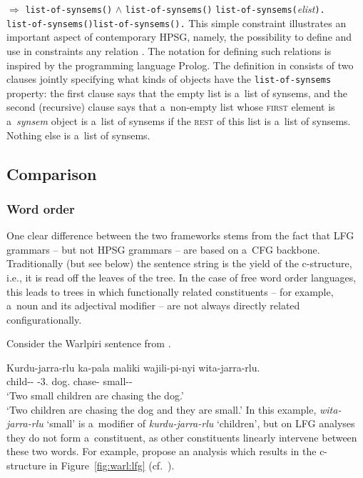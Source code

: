 \documentclass[output=paper,hidelinks]{langscibook}
\begin{document}
\ea\label{valss}
 \ensuremath{\Rightarrow} \texttt{list-of-synsems(\avm{\1})} $\land$ \texttt{list-of-synsems(\avm{\2})}
\ex\label{listss}
  \texttt{list-of-synsems(}\textit{elist}\texttt{).} \\
  \texttt{list-of-synsems(}\texttt{)}\HPSGsfl \texttt{list-of-synsems().}
\z
This simple constraint illustrates an important aspect of contemporary HPSG, namely, the possibility to define and use in constraints any relation \citep{rich:98a,rich:04}.  The notation for defining such relations is inspired by the programming language Prolog.  The definition in  consists of two clauses jointly specifying what kinds of objects have the \texttt{list-of-synsems} property: the first clause says that the empty list is a~list of synsems, and the second (recursive) clause says that a~non-empty list whose \textsc{first} element is a~\textit{synsem} object is a~list of synsems if the \textsc{rest} of this list is a~list of synsems.  Nothing else is a~list of synsems.



\subsection{Comparison}
\label{sec:gram:cmp}

\subsubsection{Word order}
\label{sec:gram:lin}

One clear difference between the two frameworks stems from the fact that LFG grammars -- but not HPSG grammars -- are based on a~CFG backbone.  Traditionally (but see below) the sentence string is the yield of the c-structure, i.e., it is read off the leaves of the tree.  In the case of free word order languages, this leads to trees in which functionally related constituents -- for example, a~noun and its adjectival modifier -- are not always directly related configurationally.

Consider the Warlpiri sentence  from \citet[257]{Simpson1991}.

\ea\label{ex:war}
\gll Kurdu-jarra-rlu ka-pala maliki wajili-pi-nyi wita-jarra-rlu. \\
child-\DU-\ERG{} \PRS{}-3.\DU{} dog.\ABS{} chase-\NPST{} small-\DU-\ERG{} \\
\glt ‘Two small children are chasing the dog.’ \\
     ‘Two children are chasing the dog and they are small.’
\z
In this example, \emph{wita-jarra-rlu} ‘small’ is a~modifier of \emph{kurdu-jarra-rlu} ‘children’, but on LFG analyses they do not form a~constituent, as other constituents linearly intervene between these two words.  For example, \citet[225]{AustBres96} propose an analysis which results in the c-structure in Figure~\ref{fig:warl:lfg} (cf.~\citealt[112]{DLM:LFG}).
\end{document}
